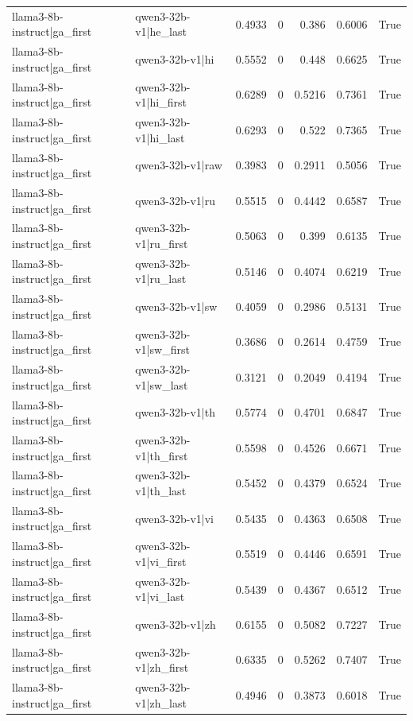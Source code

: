 \begin{table}
\begin{tabular}{l l r r r r l}
llama3-8b-instruct|ga_first & qwen3-32b-v1|he_last & 0.4933 & 0 & 0.386 & 0.6006 & True \\
llama3-8b-instruct|ga_first & qwen3-32b-v1|hi & 0.5552 & 0 & 0.448 & 0.6625 & True \\
llama3-8b-instruct|ga_first & qwen3-32b-v1|hi_first & 0.6289 & 0 & 0.5216 & 0.7361 & True \\
llama3-8b-instruct|ga_first & qwen3-32b-v1|hi_last & 0.6293 & 0 & 0.522 & 0.7365 & True \\
llama3-8b-instruct|ga_first & qwen3-32b-v1|raw & 0.3983 & 0 & 0.2911 & 0.5056 & True \\
llama3-8b-instruct|ga_first & qwen3-32b-v1|ru & 0.5515 & 0 & 0.4442 & 0.6587 & True \\
llama3-8b-instruct|ga_first & qwen3-32b-v1|ru_first & 0.5063 & 0 & 0.399 & 0.6135 & True \\
llama3-8b-instruct|ga_first & qwen3-32b-v1|ru_last & 0.5146 & 0 & 0.4074 & 0.6219 & True \\
llama3-8b-instruct|ga_first & qwen3-32b-v1|sw & 0.4059 & 0 & 0.2986 & 0.5131 & True \\
llama3-8b-instruct|ga_first & qwen3-32b-v1|sw_first & 0.3686 & 0 & 0.2614 & 0.4759 & True \\
llama3-8b-instruct|ga_first & qwen3-32b-v1|sw_last & 0.3121 & 0 & 0.2049 & 0.4194 & True \\
llama3-8b-instruct|ga_first & qwen3-32b-v1|th & 0.5774 & 0 & 0.4701 & 0.6847 & True \\
llama3-8b-instruct|ga_first & qwen3-32b-v1|th_first & 0.5598 & 0 & 0.4526 & 0.6671 & True \\
llama3-8b-instruct|ga_first & qwen3-32b-v1|th_last & 0.5452 & 0 & 0.4379 & 0.6524 & True \\
llama3-8b-instruct|ga_first & qwen3-32b-v1|vi & 0.5435 & 0 & 0.4363 & 0.6508 & True \\
llama3-8b-instruct|ga_first & qwen3-32b-v1|vi_first & 0.5519 & 0 & 0.4446 & 0.6591 & True \\
llama3-8b-instruct|ga_first & qwen3-32b-v1|vi_last & 0.5439 & 0 & 0.4367 & 0.6512 & True \\
llama3-8b-instruct|ga_first & qwen3-32b-v1|zh & 0.6155 & 0 & 0.5082 & 0.7227 & True \\
llama3-8b-instruct|ga_first & qwen3-32b-v1|zh_first & 0.6335 & 0 & 0.5262 & 0.7407 & True \\
llama3-8b-instruct|ga_first & qwen3-32b-v1|zh_last & 0.4946 & 0 & 0.3873 & 0.6018 & True \\

\end{tabular}
\end{table}
